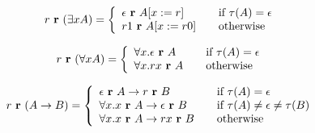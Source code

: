 \[ r \ \textbf{r} \ (\exists x A) = \left\{ 
\begin{array}{l l}
\epsilon \ \textbf{r} \ A[x:=r] & \quad \text{if $\tau (A) = \epsilon$} \\ 
r1 \ \textbf{r} \ A[x:= r0] & \quad \text{otherwise} \\

\end{array} \right.
\]

\[ r \ \textbf{r} \ (\forall x A) = \left\{ 
\begin{array}{l l}
\forall x. \epsilon \ \textbf{r} \ A & \quad \text{if $\tau (A) = \epsilon$} \\ 
\forall x. rx \ \textbf{r} \ A & \quad \text{otherwise} \\

\end{array} \right.
\]

\[ r \ \textbf{r} \ (A \to B) = \left\{ 
\begin{array}{l l}
\epsilon \ \textbf{r} \ A \to r \ \textbf{r} \ B & \quad \text{if $\tau (A) = \epsilon$} \\ 
\forall x.x \ \textbf{r} \ A \to \epsilon \ \textbf{r} \ B & \quad \text{if
  $\tau (A) \neq \epsilon \neq \tau (B)$} \\
\forall x. x \ \textbf{r} \ A \to r x  \ \textbf{r} \ B & \quad \text{otherwise} \\

\end{array} \right.
\]






